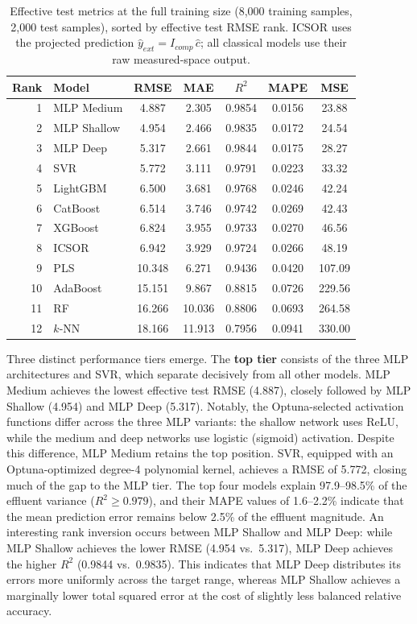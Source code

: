 \documentclass[11pt]{article}
\begin{document}
\begin{table}[htbp]
\centering
\caption{Effective test metrics at the full training size (8{,}000 training samples, 2{,}000 test samples), sorted by effective test RMSE rank. ICSOR uses the projected prediction $\hat{y}_{ext} = I_{comp}\,\hat{c}$; all classical models use their raw measured-space output.}
\label{tab:leaderboard}
\small
\begin{tabular}{@{}rlccccc@{}}
\toprule
\textbf{Rank} & \textbf{Model} & \textbf{RMSE} & \textbf{MAE} & \textbf{$R^2$} & \textbf{MAPE} & \textbf{MSE} \\
\midrule
1 & MLP Medium   & 4.887  & 2.305  & 0.9854 & 0.0156 & 23.88 \\
2 & MLP Shallow  & 4.954  & 2.466  & 0.9835 & 0.0172 & 24.54 \\
3 & MLP Deep     & 5.317  & 2.661  & 0.9844 & 0.0175 & 28.27 \\
4 & SVR          & 5.772  & 3.111  & 0.9791 & 0.0223 & 33.32 \\
5 & LightGBM     & 6.500  & 3.681  & 0.9768 & 0.0246 & 42.24 \\
6 & CatBoost     & 6.514  & 3.746  & 0.9742 & 0.0269 & 42.43 \\
7 & XGBoost      & 6.824  & 3.955  & 0.9733 & 0.0270 & 46.56 \\
8 & ICSOR        & 6.942  & 3.929  & 0.9724 & 0.0266 & 48.19 \\
9 & PLS          & 10.348 & 6.271  & 0.9436 & 0.0420 & 107.09 \\
10 & AdaBoost    & 15.151 & 9.867  & 0.8815 & 0.0726 & 229.56 \\
11 & RF          & 16.266 & 10.036 & 0.8806 & 0.0693 & 264.58 \\
12 & $k$-NN      & 18.166 & 11.913 & 0.7956 & 0.0941 & 330.00 \\
\bottomrule
\end{tabular}
\end{table}

Three distinct performance tiers emerge. The \textbf{top tier} consists of the three MLP architectures and SVR, which separate decisively from all other models. MLP Medium achieves the lowest effective test RMSE (4.887), closely followed by MLP Shallow (4.954) and MLP Deep (5.317). Notably, the Optuna-selected activation functions differ across the three MLP variants: the shallow network uses ReLU, while the medium and deep networks use logistic (sigmoid) activation. Despite this difference, MLP Medium retains the top position. SVR, equipped with an Optuna-optimized degree-4 polynomial kernel, achieves a RMSE of 5.772, closing much of the gap to the MLP tier. The top four models explain 97.9--98.5\% of the effluent variance ($R^2 \ge 0.979$), and their MAPE values of 1.6--2.2\% indicate that the mean prediction error remains below 2.5\% of the effluent magnitude. An interesting rank inversion occurs between MLP Shallow and MLP Deep: while MLP Shallow achieves the lower RMSE (4.954 vs.\ 5.317), MLP Deep achieves the higher $R^2$ (0.9844 vs.\ 0.9835). This indicates that MLP Deep distributes its errors more uniformly across the target range, whereas MLP Shallow achieves a marginally lower total squared error at the cost of slightly less balanced relative accuracy.
\end{document}
